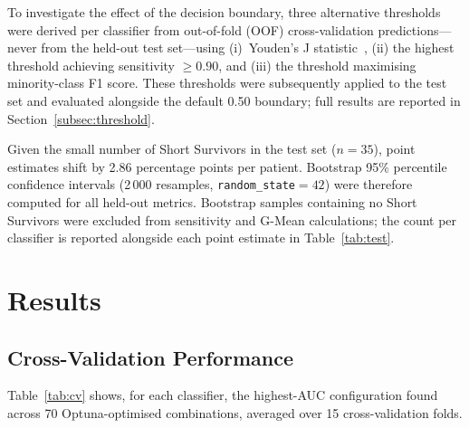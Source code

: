 \documentclass[preprint,12pt]{elsarticle}
\begin{document}
To investigate the effect of the decision boundary, three alternative thresholds
were derived per classifier from out-of-fold (OOF) cross-validation predictions---never
from the held-out test set---using (i)~Youden's J statistic~\cite{youden1950}, (ii) the
highest threshold achieving sensitivity $\geq 0.90$, and (iii) the threshold maximising
minority-class F1 score. These thresholds were subsequently applied to the test set
and evaluated alongside the default 0.50 boundary; full results are reported in
Section~\ref{subsec:threshold}.

Given the small number of Short Survivors in the test set ($n = 35$), point
estimates shift by 2.86 percentage points per patient. Bootstrap 95\% percentile
confidence intervals (2\,000 resamples, \texttt{random\_state}$=42$) were therefore
computed for all held-out metrics. Bootstrap samples containing no Short Survivors
were excluded from sensitivity and G-Mean calculations; the count per classifier is
reported alongside each point estimate in Table~\ref{tab:test}.

\section{Results}
\label{sec:results}

\subsection{Cross-Validation Performance}

Table~\ref{tab:cv} shows, for each classifier, the highest-AUC configuration
found across 70 Optuna-optimised combinations, averaged over 15 cross-validation
folds.
\end{document}
